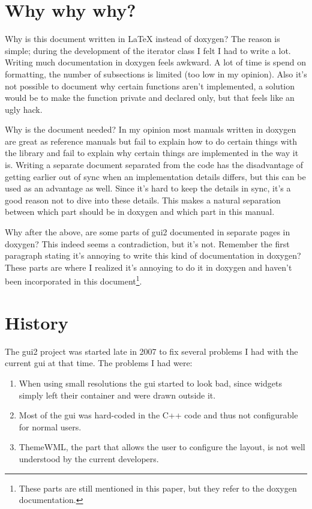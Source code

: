 \documentclass[a4paper,notitlepage,twocolumn,draft]{report}
\begin{document}
\section{Why why why?}

Why is this document written in \LaTeX{} instead of doxygen? The reason is
simple; during the development of the iterator class I felt I had to write a
lot. Writing much documentation in doxygen feels awkward. A lot of time is spend
on formatting, the number of subsections is limited (too low in my opinion).
Also it's not possible to document why certain functions aren't implemented, a
solution would be to make the function private and declared only, but that feels
like an ugly hack.

Why is the document needed? In my opinion most manuals written in doxygen are
great as reference manuals but fail to explain how to do certain things with the
library and fail to explain why certain things are implemented in the way it is.
Writing a separate document separated from the code has the disadvantage of
getting earlier out of sync when an implementation details differs, but this can
be used as an advantage as well. Since it's hard to keep the details in sync,
it's a good reason not to dive into these details. This makes a natural
separation between which part should be in doxygen and which part in this
manual.

Why after the above, are some parts of gui2 documented in separate pages in
doxygen? This indeed seems a contradiction, but it's not. Remember the first
paragraph stating it's annoying to write this kind of documentation in doxygen?
These parts are where I realized it's annoying to do it in doxygen and haven't
been incorporated in this document\footnote{These parts are still mentioned in
this paper, but they refer to the doxygen documentation.}.

\section{History}

The gui2 project was started late in 2007 to fix several problems I had with the
current gui at that time. The problems I had were:
\begin{enumerate}
\item When using small resolutions the gui started to look bad, since widgets
	simply left their container and were drawn outside it.
\item Most of the gui was hard-coded in the C++ code and thus not configurable
	for normal users.
\item ThemeWML, the part that allows the user to configure the layout, is not
	well understood by the current developers.
\end{enumerate}
\end{document}
